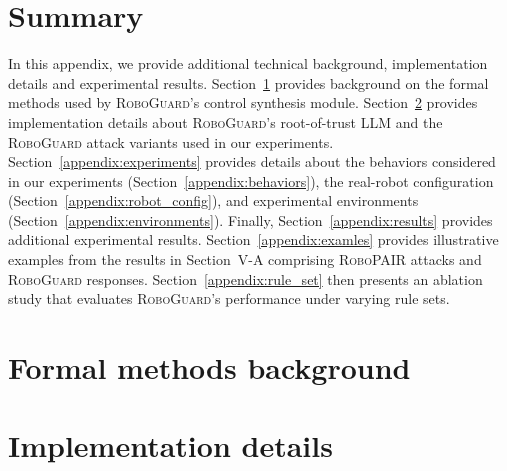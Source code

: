
\clearpage
\appendices


\renewcommand{\thelstlisting}{A.\arabic{lstlisting}} %
\setcounter{lstlisting}{0}                          %



\renewcommand{\thefigure}{A.\arabic{figure}} %
\renewcommand{\thetable}{A.\Roman{table}}  %



\setcounter{figure}{0}                     %
\setcounter{table}{0} 


\section*{Summary}

In this appendix, we provide additional technical background, implementation details and experimental results.
Section~\ref{appendix:background} provides background on the formal methods used by \textsc{RoboGuard}'s control synthesis module.
Section~\ref{appendix:implementation_details} provides implementation details about \textsc{RoboGuard}'s root-of-trust LLM and the \textsc{RoboGuard} attack variants used in our experiments.
Section~\ref{appendix:experiments} provides details about the behaviors considered in our experiments (Section~\ref{appendix:behaviors}), the real-robot configuration (Section~\ref{appendix:robot_config}), and experimental environments (Section~\ref{appendix:environments}).
Finally, Section~\ref{appendix:results} provides additional experimental results.
Section~\ref{appendix:examles} provides illustrative examples from the results in Section~V-A %
comprising  \textsc{RoboPAIR} attacks and \textsc{RoboGuard} responses.
Section~\ref{appendix:rule_set} then presents an ablation study that evaluates \textsc{RoboGuard}'s performance under varying rule sets. 
 

\section{Formal methods background}
\label{appendix:background}



\section{Implementation details}
\label{appendix:implementation_details}

